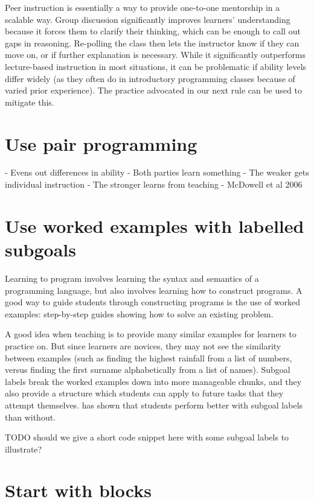 \documentclass{article}
\begin{document}
Peer instruction is essentially
a way to provide one-to-one mentorship in a scalable way.
Group discussion significantly improves learners' understanding
because it forces them to clarify their thinking,
which can be enough to call out gaps in reasoning.
Re-polling the class then lets the instructor know if they can move on,
or if further explanation is necessary.
While it significantly outperforms lecture-based instruction in most situations,
it can be problematic if ability levels differ widely
(as they often do in introductory programming classes
because of varied prior experience).
The practice advocated in our next rule can be used to mitigate this.

\section{Use pair programming}

- Evens out differences in ability
- Both parties learn something
  - The weaker gets individual instruction
  - The stronger learns from teaching
- McDowell et al 2006

\section{Use worked examples with labelled subgoals}

Learning to program involves learning the syntax and semantics of a programming language, but also involves learning how to construct programs.  A good way to guide students through constructing programs is the use of worked examples: step-by-step guides showing how to solve an existing problem.

A good idea when teaching is to provide many similar examples for learners to practice on.  But since learners are novices, they may not see the similarity between examples (such as finding the highest rainfall from a list of numbers, versus finding the first surname alphabetically from a list of names).  Subgoal labels break the worked examples down into more manageable chunks, and they also provide a structure which students can apply to future tasks that they attempt themselves.  \citet{morrison-subgoals} has shown that students perform better with subgoal labels than without.

TODO should we give a short code snippet here with some subgoal labels to illustrate?


\section{Start with blocks}
\end{document}
